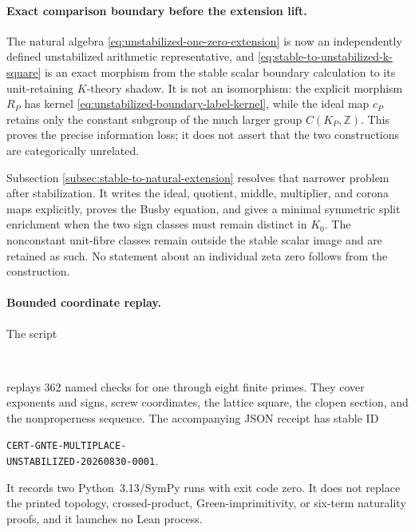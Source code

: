 \paragraph{Exact comparison boundary before the extension lift.}
The natural algebra \eqref{eq:unstabilized-one-zero-extension} is now an
independently defined unstabilized arithmetic representative, and
\eqref{eq:stable-to-unstabilized-k-square} is an exact morphism from the
stable scalar boundary calculation to its unit-retaining $K$-theory shadow.
It is not an isomorphism: the explicit morphism
$R_P$ has kernel \eqref{eq:unstabilized-boundary-label-kernel}, while the ideal
map $c_P$ retains only the constant subgroup of the much larger group
$C(K_P,\mathbb Z)$.  This proves the precise information loss; it does not
assert that the two constructions are categorically unrelated.

Subsection \ref{subsec:stable-to-natural-extension} resolves that narrower
problem after stabilization.  It writes the ideal, quotient, middle,
multiplier, and corona maps explicitly, proves the Busby equation, and gives a
minimal symmetric split enrichment when the two sign classes must remain
distinct in $K_0$.  The nonconstant unit-fibre classes remain outside the
stable scalar image and are retained as such.  No statement about an
individual zeta zero follows from the construction.

\paragraph{Bounded coordinate replay.}
The script
\begin{center}
\footnotesize
{}\\
\end{center}
replays 362 named checks for one through eight finite primes.  They cover
exponents and signs, screw coordinates, the lattice square, the clopen
section, and the nonproperness sequence.  The accompanying JSON receipt has
stable ID
\begin{center}
\footnotesize
\texttt{CERT-GNTE-MULTIPLACE-}\\
\texttt{UNSTABILIZED-20260830-0001}.
\end{center}
It records two Python~3.13/SymPy runs with exit code zero.  It does not replace
the printed topology, crossed-product, Green-imprimitivity, or six-term
naturality proofs, and it launches no Lean process.

